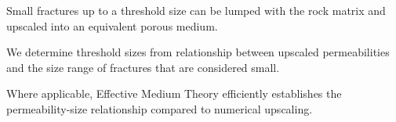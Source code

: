 \documentclass[draft]{agujournal2018}
\begin{document}




\begin{keypoints}
\item Small fractures up to a threshold size can be lumped with the rock matrix and upscaled into an equivalent porous medium.
\item We determine threshold sizes from relationship between upscaled permeabilities and the size range of fractures that are considered small.
\item Where applicable, Effective Medium Theory efficiently establishes the permeability-size relationship compared to numerical upscaling.
\end{keypoints}

%
%

\end{document}
